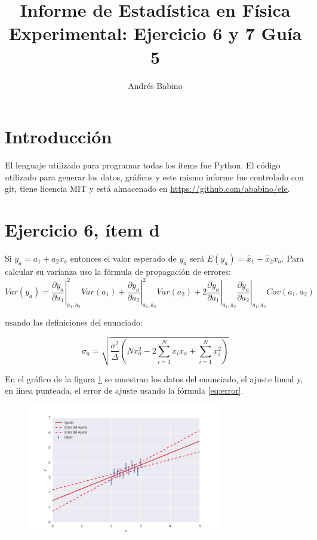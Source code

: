 \title{Informe de Estadística en Física Experimental: Ejercicio 6 y 7 Guía 5}
\author{Andr\'es Babino}


\maketitle
\section{Introducción}
El lenguaje utilizado para programar todas los ítems fue Python.
El código utilizado para generar los datos, gráficos y este mismo informe fue controlado con git, tiene licencia MIT y está almacenado en \url{https://github.com/ababino/efe}.

\section*{Ejercicio 6, ítem d}
Si $y_a=a_1 + a_2 x_a$ entonces el valor esperado de $y_a$ será $E(y_a)=\hat x_1 + \hat x_2 x_a$.
Para calcular su varianza uso la fórmula de propagación de errores:
\begin{equation}
Var(y_a) = \left. \frac{\partial y_a}{\partial a_1}\right|_{\hat a_1, \hat a_2}^2 Var(a_1) + \left. \frac{\partial y_a}{\partial a_2}\right|_{\hat a_1, \hat a_2}^2 Var(a_2) + 2 \left. \frac{\partial y_a}{\partial a_1}\right|_{\hat a_1, \hat a_2} \left. \frac{\partial y_a}{\partial a_2}\right|_{\hat a_1, \hat a_2} Cov(a_1, a_2)
\label{eq:prop}
\end{equation}

usando las definiciones del enunciado:

\begin{equation}
\sigma_a = \sqrt{\frac{\sigma^2}{\Delta} \left(N x_a^2 -2 \sum_{i=1}^N x_i x_a +\sum_{i=1}^N x_i^2\right)}
\label{eq:error}
\end{equation}

En el gráfico de la figura \ref{fig:e6d} se muestran los datos del enunciado, el ajuste lineal y, en linea punteada, el error de ajuste usando la fórmula \ref{eq:error}.

\begin{figure}
\centering
\includegraphics[width=0.75\textwidth]{ej6d.jpg}
\caption[]{}
\label{fig:e6d}
\end{figure}

